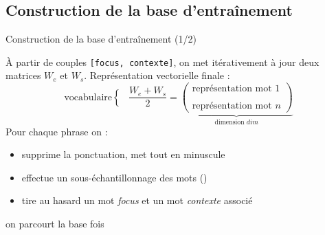 \documentclass[10pt,xcolor=table,color={dvipsnames,usenames},ignorenonframetext,usepdftitle=false,french]{beamer}
\begin{document}
\hypertarget{construction-de-la-base-dentrauxeenement}{%
\subsection{Construction de la base
d’entraînement}\label{construction-de-la-base-dentrauxeenement}}

\begin{frame}[fragile]{Construction de la base d’entraînement (1/2)}
\protect\hypertarget{construction-de-la-base-dentrauxeenement-12}{}

\bcoutil À partir de couples \texttt{{[}focus,\ contexte{]}}, on met
itérativement à jour deux matrices \(W_e\) et \(W_s\). Représentation
vectorielle finale : \[
\text{vocabulaire}
\begin{cases}\\\\\\
\end{cases}\frac{W_e+W_s}{2}=\underbrace{
\begin{pmatrix}
\text{représentation mot 1} \\
\\
\text{représentation mot }n 
\end{pmatrix}}_{\text{dimension }dim}
\] \pause Pour chaque phrase on :

\begin{itemize}
\item
  supprime la ponctuation, met tout en minuscule
\item
  effectue un sous-échantillonnage des mots ()
\item
  tire au hasard un mot \emph{focus} et un mot \emph{contexte} associé
\end{itemize}

\faArrowCircleRight{} on parcourt la base  fois

\end{frame}
\end{document}
